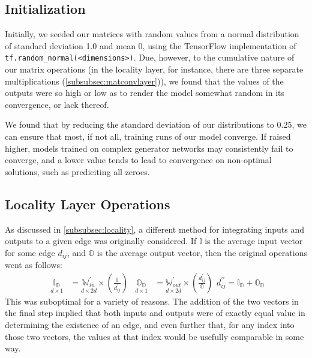 \subsection{Initialization}
Initially, we seeded our matrices with random values from a normal distribution 
of standard deviation 1.0 and mean 0, using the TensorFlow implementation of 
\texttt{tf.random\_normal(<dimensions>)}. Due, however, to the cumulative nature 
of our matrix operations (in the locality layer, for instance, there are three 
separate multiplications (\ref{subsubsec:matconvlayer})), we found that the 
values of the outputs were so high or low as to render the model somewhat random 
in its convergence, or lack thereof.

We found that by reducing the standard deviation of our distributions to 0.25, 
we can ensure that most, if not all, training runs of our model converge. If 
raised higher, models trained on complex generator networks may consistently 
fail to converge, and a lower value tends to lead to convergence on non-optimal 
solutions, such as prediciting all zeroes. 

\subsection{Locality Layer Operations}
\label{subsec:localops}
As discussed in \ref{subsubsec:locality}, a different method for integrating 
inputs and outputs to a given edge was originally considered. If $\mathbb{I}$ is 
the average input vector for some edge $d_{ij}$, and $\mathbb{O}$ is the average 
output vector, then the original operations went as follows:
\begin{subequations}
\begin{align}
	\underset{d \times 1}{\mathbb{I_D}} &= \underset{d \times 
	2d}{\mathbb{W}_{in}^\prime} \times 
	\left(\frac{\mathbb{I}}{d_{ij}^\prime}\right) &
	\underset{d \times 1}{\mathbb{O_D}} &= \underset{d \times 
		2d}{\mathbb{W}_{out}^\prime} \times 
		\left(\frac{d_{ij}^\prime}{\mathbb{O}}\right)
\end{align}
\begin{equation}
		d_{ij}^{\prime\prime} = \mathbb{I_D} + \mathbb{O_D}
\end{equation}
\end{subequations}
This was suboptimal for a variety of reasons. The addition of the two vectors in 
the final step implied that both inputs and outputs were of exactly equal value 
in determining the existence of an edge, and even further that, for any index 
into those two vectors, the values at that index would be usefully comparable in 
some way.

